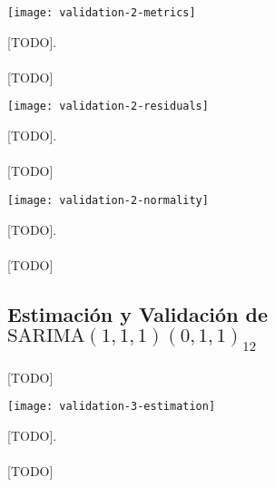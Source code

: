 \documentclass[a4paper, spanish]{article}
\begin{document}
      \begin{table}[htb!]
        \centering
        \texttt{[image: validation-2-metrics]}
        \caption{[TODO].}
        \label{}
      \end{table}

      \paragraph{}
      [TODO]

      \begin{table}[htb!]
        \centering
        \texttt{[image: validation-2-residuals]}
        \caption{[TODO].}
        \label{}
      \end{table}

      \paragraph{}
      [TODO]

      \begin{table}[htb!]
        \centering
        \texttt{[image: validation-2-normality]}
        \caption{[TODO].}
        \label{}
      \end{table}

      \paragraph{}
      [TODO]

    \subsection{Estimación y Validación de \textbf{$\text{SARIMA}(1, 1, 1)(0, 1, 1)_{12}$}}
    \label{sec:fitting_3}

      \paragraph{}
      [TODO]

      \begin{table}[htb!]
        \centering
        \texttt{[image: validation-3-estimation]}
        \caption{[TODO].}
        \label{}
      \end{table}

      \paragraph{}
      [TODO]
\end{document}
